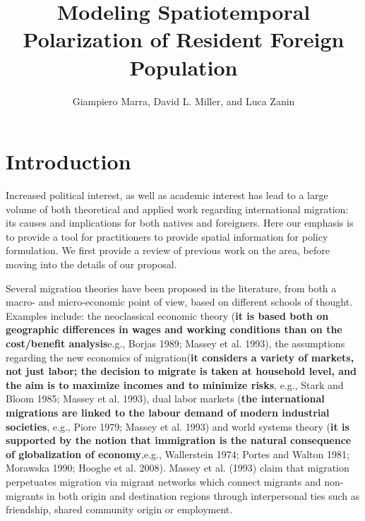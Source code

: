 \documentclass[10pt] {article}
\theoremstyle{definition}
\theoremstyle{plain}
\begin{document}
\title{Modeling Spatiotemporal Polarization of Resident Foreign Population}

\author{Giampiero Marra, David L. Miller, and Luca Zanin
}

\maketitle








\section{Introduction \label{IN}}

Increased political interest, as well as academic interest has lead to a large volume of both theoretical and applied work regarding international migration: its causes and implications for both natives and foreigners. Here our emphasis is to provide a tool for practitioners to provide spatial information for policy formulation. We first provide a review of previous work on the area, before moving into the details of our proposal.

Several migration theories have been proposed in the literature, from both a macro- and micro-economic point of view, based on different schools of thought. Examples include: the neoclassical economic theory (\textbf{it is based both on geographic differences in wages and working conditions than on the cost/benefit analysis}e.g., Borjas 1989; Massey et al. 1993), the assumptions regarding the new economics of migration(\textbf{it considers a variety of markets, not just labor; the decision to migrate is taken at household level, and the aim is to maximize incomes and to minimize risks}, e.g., Stark and Bloom 1985; Massey et al. 1993), dual labor markets (\textbf{the international migrations are linked to the labour demand of modern industrial societies}, e.g., Piore 1979; Massey et al. 1993) and world systems theory (\textbf{it is supported by the notion that immigration is the natural consequence of globalization of economy},e.g., Wallerstein 1974; Portes and Walton 1981; Morawska 1990; Hooghe et al. 2008). Massey et al. (1993) claim that migration perpetuates migration via migrant networks which connect migrants and non-migrants in both origin and destination regions through interpersonal ties such as friendship, shared community origin or employment.
\end{document}
